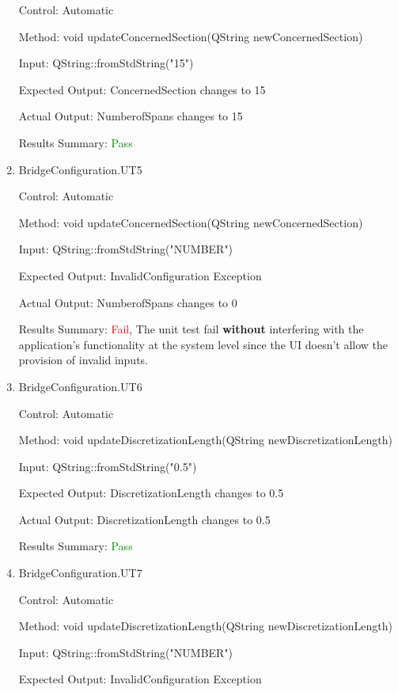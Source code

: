\documentclass[12pt, titlepage]{article}
\begin{document}
\begin{enumerate}
    Control: Automatic
    
    Method:  void updateConcernedSection(QString newConcernedSection)
    
    Input: QString::fromStdString("15")
    
    Expected Output: ConcernedSection changes to 15

    Actual Output: NumberofSpans changes to 15

    Results Summary: \textcolor{green} {Pass}

    \item  {BridgeConfiguration.UT5\\}
    
    Control: Automatic
    
    Method:  void updateConcernedSection(QString newConcernedSection)
    
    Input: QString::fromStdString("NUMBER")
    
    Expected Output: InvalidConfiguration Exception

    Actual Output: NumberofSpans changes to 0

    Results Summary: \textcolor{red} {Fail}, The unit test fail
\textbf{without} interfering with the application’s functionality at the system level
since the UI doesn’t allow the provision of invalid inputs.

    \item  {BridgeConfiguration.UT6\\}
    
    Control: Automatic
    
    Method:  void updateDiscretizationLength(QString newDiscretizationLength)
    
    Input: QString::fromStdString("0.5")
    
    Expected Output: DiscretizationLength changes to 0.5

    Actual Output: DiscretizationLength changes to 0.5

    Results Summary: \textcolor{green} {Pass}

    \item {BridgeConfiguration.UT7\\}

    Control: Automatic
    
    Method:  void updateDiscretizationLength(QString newDiscretizationLength)
    
    Input: QString::fromStdString("NUMBER")
    
    Expected Output: InvalidConfiguration Exception


\end{enumerate}
\end{document}
